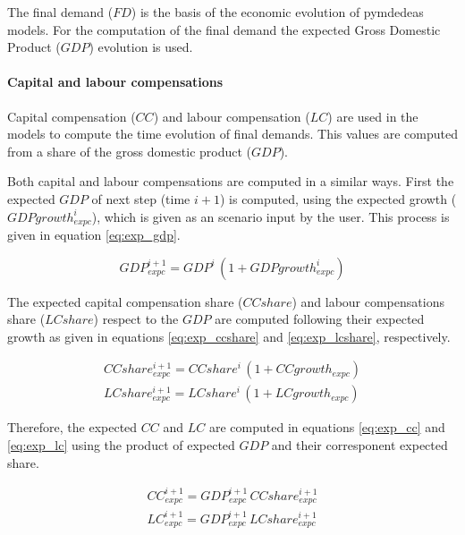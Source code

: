The final demand ($FD$) is the basis of the economic evolution of pymdedeas models. For the computation of the final demand the expected Gross Domestic Product ($GDP$) evolution is used.

\paragraph{Capital and labour compensations}


Capital compensation ($CC$) and labour compensation ($LC$) are used in the models to compute the time evolution of final demands. This values are computed from a share of the gross domestic product ($GDP$).

Both capital and labour compensations are computed in a similar ways. First the expected $GDP$ of next step (time $i\!+\!1$) is computed, using the expected growth ($GDPgrowth^{i}_{expc}$), which is  given as an scenario input by the user. This process is given in equation \eqref{eq:exp_gdp}.

\begin{equation}
GDP_{expc}^{i+1} = GDP^i\,(1+GDPgrowth^{i}_{expc})
\label{eq:exp_gdp}
\end{equation}

The expected capital compensation share ($CCshare$) and labour compensations share ($LCshare$) respect to the $GDP$ are computed following their expected growth as given in equations \eqref{eq:exp_ccshare} and \eqref{eq:exp_lcshare}, respectively.

\begin{gather}
CCshare_{expc}^{i+1} = CCshare^i\,(1+CCgrowth_{expc}) \label{eq:exp_ccshare}\\
LCshare_{expc}^{i+1} = LCshare^i\,(1+LCgrowth_{expc}) \label{eq:exp_lcshare}
\end{gather}

Therefore, the expected $CC$ and $LC$ are computed in equations \eqref{eq:exp_cc} and \eqref{eq:exp_lc} using the product of expected $GDP$ and their corresponent expected share.

\begin{gather}
CC_{expc}^{i+1} = GDP_{expc}^{i+1} \, CCshare_{expc}^{i+1}\label{eq:exp_cc}\\
LC_{expc}^{i+1} = GDP_{expc}^{i+1} \, LCshare_{expc}^{i+1}\label{eq:exp_lc}
\end{gather}

